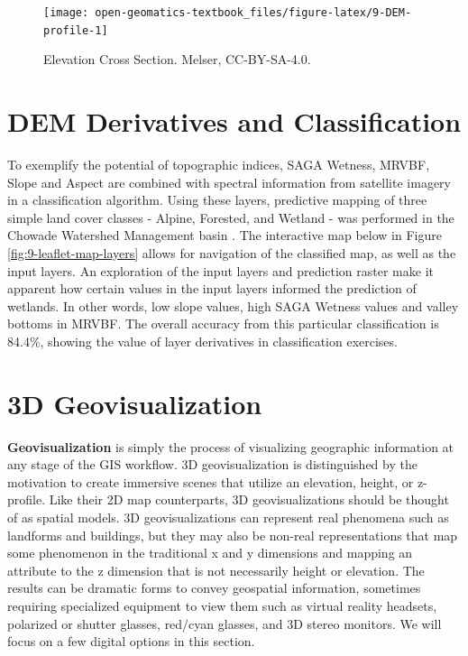 \documentclass[
]{book}
\begin{document}
\begin{figure}
\texttt{[image: open-geomatics-textbook\_files/figure-latex/9-DEM-profile-1]} \caption{Elevation Cross Section. Melser, CC-BY-SA-4.0.}\label{fig:9-DEM-profile}
\end{figure}

\hypertarget{dem-derivatives-and-classification}{%
\section{DEM Derivatives and Classification}\label{dem-derivatives-and-classification}}

To exemplify the potential of topographic indices, SAGA Wetness, MRVBF, Slope and Aspect are combined with spectral information from satellite imagery in a classification algorithm. Using these layers, predictive mapping of three simple land cover classes - Alpine, Forested, and Wetland - was performed in the Chowade Watershed Management basin \citep{govbcwater}. The interactive map below in Figure \ref{fig:9-leaflet-map-layers} allows for navigation of the classified map, as well as the input layers. An exploration of the input layers and prediction raster make it apparent how certain values in the input layers informed the prediction of wetlands. In other words, low slope values, high SAGA Wetness values and valley bottoms in MRVBF. The overall accuracy from this particular classification is 84.4\%, showing the value of layer derivatives in classification exercises.

\hypertarget{d-geovisualization}{%
\section{3D Geovisualization}\label{d-geovisualization}}

\textbf{Geovisualization} is simply the process of visualizing geographic information at any stage of the GIS workflow. 3D geovisualization is distinguished by the motivation to create immersive scenes that utilize an elevation, height, or z-profile. Like their 2D map counterparts, 3D geovisualizations should be thought of as spatial models. 3D geovisualizations can represent real phenomena such as landforms and buildings, but they may also be non-real representations that map some phenomenon in the traditional x and y dimensions and mapping an attribute to the z dimension that is not necessarily height or elevation. The results can be dramatic forms to convey geospatial information, sometimes requiring specialized equipment to view them such as virtual reality headsets, polarized or shutter glasses, red/cyan glasses, and 3D stereo monitors. We will focus on a few digital options in this section.
\end{document}
